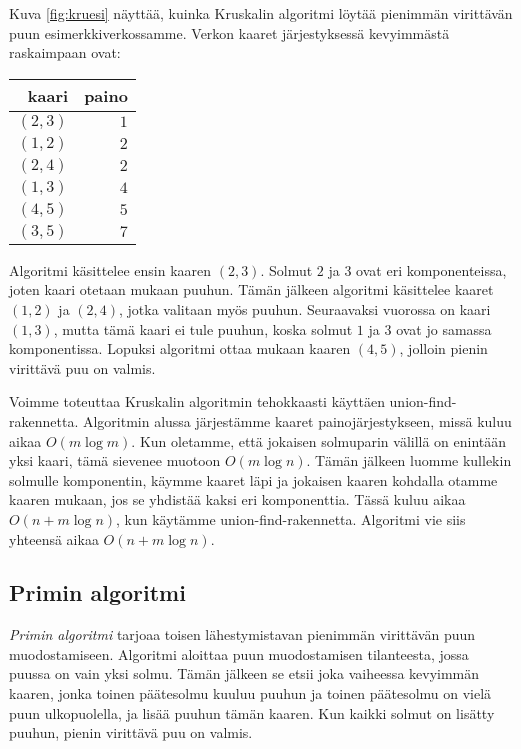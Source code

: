 Kuva \ref{fig:kruesi} näyttää, kuinka Kruskalin algoritmi löytää pienimmän virittävän
puun esimerkkiverkossamme.
Verkon kaaret järjestyksessä kevyim\-mästä raskaimpaan ovat:

\begin{center}
\begin{tabular}{rr}
kaari & paino \\
\hline
$(2,3)$ & $1$ \\
$(1,2)$ & $2$ \\
$(2,4)$ & $2$ \\
$(1,3)$ & $4$ \\
$(4,5)$ & $5$ \\
$(3,5)$ & $7$ \\
\end{tabular}
\end{center}

Algoritmi käsittelee ensin kaaren $(2,3)$.
Solmut $2$ ja $3$ ovat eri komponenteissa,
joten kaari otetaan mukaan puuhun.
Tämän jälkeen algoritmi käsittelee kaaret $(1,2)$ ja $(2,4)$,
jotka valitaan myös puuhun.
Seuraavaksi vuorossa on kaari $(1,3)$,
mutta tämä kaari ei tule puuhun,
koska solmut $1$ ja $3$ ovat jo samassa komponentissa.
Lopuksi algoritmi ottaa mukaan kaaren $(4,5)$,
jolloin pienin virittävä puu on valmis.

Voimme toteuttaa Kruskalin algoritmin tehokkaasti
käyttäen union-find-rakennetta.
Algoritmin alussa järjestämme kaaret painojärjestykseen,
missä kuluu aikaa $O(m \log m)$.
Kun oletamme, että jokaisen solmuparin välillä
on enintään yksi kaari, tämä sievenee muotoon $O(m \log n)$.
Tämän jälkeen luomme kullekin solmulle komponentin,
käymme kaaret läpi ja jokaisen kaaren
kohdalla otamme kaaren mukaan, jos se yhdistää kaksi eri komponenttia.
Tässä kuluu aikaa $O(n+m \log n)$,
kun käytämme union-find-rakennetta.
Algoritmi vie siis yhteensä aikaa $O(n+m \log n)$.

\subsection{Primin algoritmi}


\emph{Primin algoritmi} tarjoaa toisen lähestymistavan
pienimmän virittävän puun muodostamiseen.
Algoritmi aloittaa puun muodostamisen tilanteesta,
jossa puussa on vain yksi solmu.
Tämän jälkeen se etsii joka vaiheessa kevyimmän kaaren,
jonka toinen päätesolmu kuuluu puuhun ja toinen
päätesolmu on vielä puun ulkopuolella, ja lisää puuhun tämän kaaren.
Kun kaikki solmut on lisätty puuhun, pienin virittävä puu on valmis.

